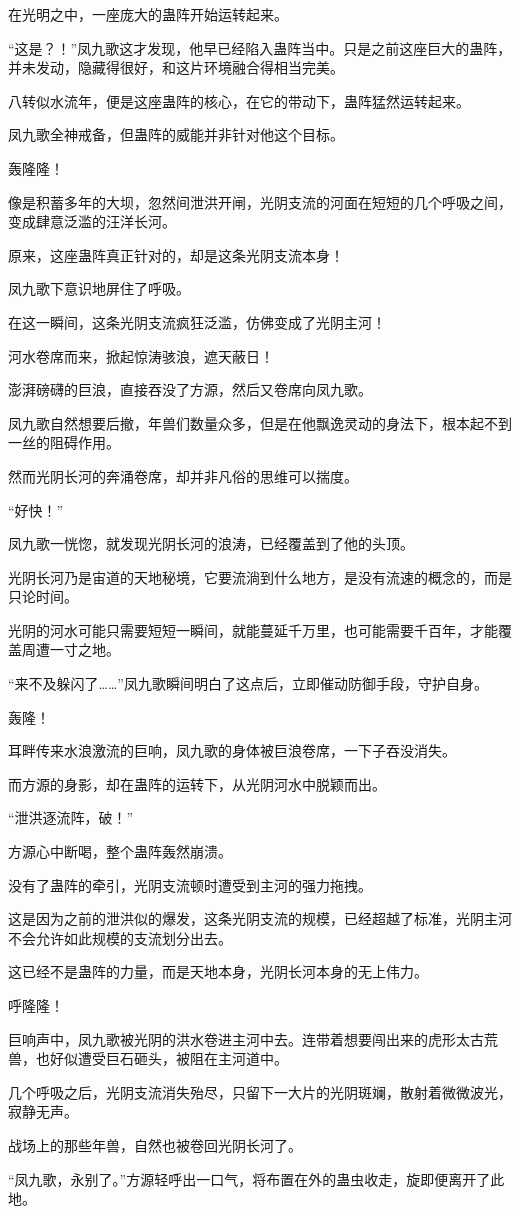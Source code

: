 \begin{this_body}
在光明之中，一座庞大的蛊阵开始运转起来。

“这是？！”凤九歌这才发现，他早已经陷入蛊阵当中。只是之前这座巨大的蛊阵，并未发动，隐藏得很好，和这片环境融合得相当完美。

八转似水流年，便是这座蛊阵的核心，在它的带动下，蛊阵猛然运转起来。

凤九歌全神戒备，但蛊阵的威能并非针对他这个目标。

轰隆隆！

像是积蓄多年的大坝，忽然间泄洪开闸，光阴支流的河面在短短的几个呼吸之间，变成肆意泛滥的汪洋长河。

原来，这座蛊阵真正针对的，却是这条光阴支流本身！

凤九歌下意识地屏住了呼吸。

在这一瞬间，这条光阴支流疯狂泛滥，仿佛变成了光阴主河！

河水卷席而来，掀起惊涛骇浪，遮天蔽日！

澎湃磅礴的巨浪，直接吞没了方源，然后又卷席向凤九歌。

凤九歌自然想要后撤，年兽们数量众多，但是在他飘逸灵动的身法下，根本起不到一丝的阻碍作用。

然而光阴长河的奔涌卷席，却并非凡俗的思维可以揣度。

“好快！”

凤九歌一恍惚，就发现光阴长河的浪涛，已经覆盖到了他的头顶。

光阴长河乃是宙道的天地秘境，它要流淌到什么地方，是没有流速的概念的，而是只论时间。

光阴的河水可能只需要短短一瞬间，就能蔓延千万里，也可能需要千百年，才能覆盖周遭一寸之地。

“来不及躲闪了……”凤九歌瞬间明白了这点后，立即催动防御手段，守护自身。

轰隆！

耳畔传来水浪激流的巨响，凤九歌的身体被巨浪卷席，一下子吞没消失。

而方源的身影，却在蛊阵的运转下，从光阴河水中脱颖而出。

“泄洪逐流阵，破！”

方源心中断喝，整个蛊阵轰然崩溃。

没有了蛊阵的牵引，光阴支流顿时遭受到主河的强力拖拽。

这是因为之前的泄洪似的爆发，这条光阴支流的规模，已经超越了标准，光阴主河不会允许如此规模的支流划分出去。

这已经不是蛊阵的力量，而是天地本身，光阴长河本身的无上伟力。

呼隆隆！

巨响声中，凤九歌被光阴的洪水卷进主河中去。连带着想要闯出来的虎形太古荒兽，也好似遭受巨石砸头，被阻在主河道中。

几个呼吸之后，光阴支流消失殆尽，只留下一大片的光阴斑斓，散射着微微波光，寂静无声。

战场上的那些年兽，自然也被卷回光阴长河了。

“凤九歌，永别了。”方源轻呼出一口气，将布置在外的蛊虫收走，旋即便离开了此地。

\end{this_body}


